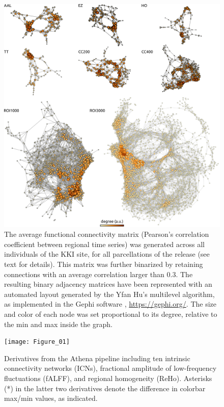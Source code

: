 \documentclass[preprint,12pt,3p]{elsarticle}
\begin{document}
\begin{figure}[!t]
\begin{center}
  \includegraphics[width=\linewidth]{fig_connectomes}
  \caption{The average functional connectivity matrix (Pearson's correlation coefficient between regional time series) was generated across all individuals of the KKI site, for all parcellations of the release (see text for details). This matrix was further binarized by retaining connections with an average correlation larger than 0.3. The resulting binary adjacency matrices have been represented with an automated layout generated by the Yfan Hu's multilevel algorithm, as implemented in the Gephi software \citep{bastian2009geph}, \url{https://gephi.org/}. The size and color of each node was set proportional to its degree, relative to the min and max inside the graph.}   
  \label{fig:connectomes}
\end{center}
\end{figure}


\begin{figure}[!t]
\begin{center}
  \texttt{[image: Figure\_01]}
  \caption{Derivatives from the Athena pipeline including ten intrinsic connectivity networks (ICNs), fractional amplitude of low-frequency fluctuations (fALFF), and regional homogeneity (ReHo). Asterisks (*) in the latter two derivatives denote the difference in colorbar max/min values, as indicated.}
  \label{fig:derivatives}
\end{center}
\end{figure}
\end{document}
